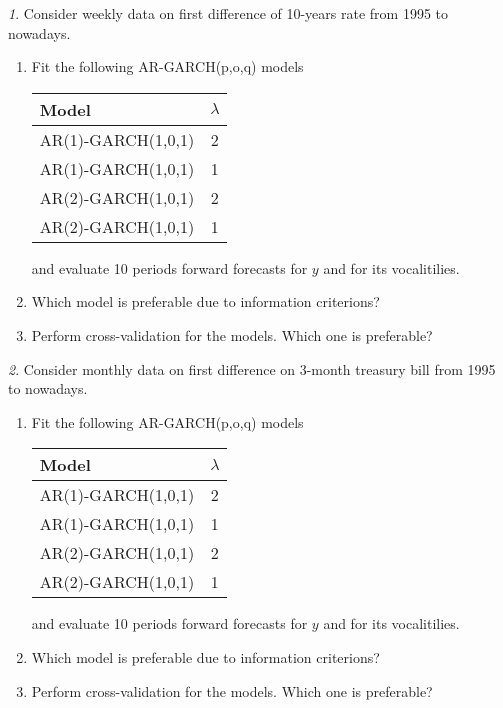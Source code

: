 \documentclass[12pt]{article}
\theoremstyle{remark}
\newtheorem{exercise}{}[section]
\begin{document}
\begin{exercise}
Consider weekly data on first difference of 10-years rate from 1995 to nowadays.
\begin{enumerate}
	\item Fit the following AR-GARCH(p,o,q) models
	\begin{center}
	\begin{tabular}{l|c}
		Model & \(\lambda\) \\ \hline
		AR(1)-GARCH(1,0,1) & 2 \\
		AR(1)-GARCH(1,0,1) & 1 \\
		AR(2)-GARCH(1,0,1) & 2 \\
		AR(2)-GARCH(1,0,1) & 1 \\ \hline
	\end{tabular}
	\end{center} 
	and evaluate 10 periods forward forecasts for \(y\) and for its vocalitilies.
	\item Which model is preferable due to information criterions?
	\item Perform cross-validation for the models. Which one is preferable?
\end{enumerate}
\end{exercise}
	
\begin{exercise}
Consider monthly data on first difference on 3-month treasury bill from 1995 to nowadays.
\begin{enumerate}
	\item Fit the following AR-GARCH(p,o,q) models
	\begin{center}
	\begin{tabular}{l|c}
		Model & \(\lambda\) \\ \hline
		AR(1)-GARCH(1,0,1) & 2 \\
		AR(1)-GARCH(1,0,1) & 1 \\
		AR(2)-GARCH(1,0,1) & 2 \\
		AR(2)-GARCH(1,0,1) & 1 \\ \hline
	\end{tabular}
	\end{center} 
	and evaluate 10 periods forward forecasts for \(y\) and for its vocalitilies.
	\item Which model is preferable due to information criterions?
	\item Perform cross-validation for the models. Which one is preferable?
\end{enumerate}
\end{exercise}
\end{document}
